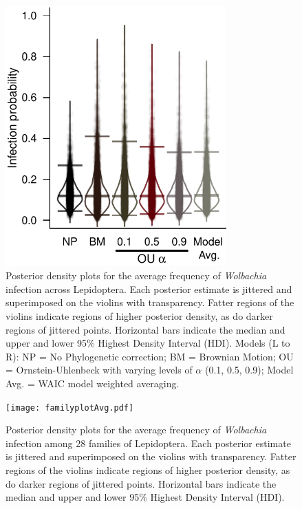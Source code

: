 \documentclass{frontiersSCNS} %
\begin{document}
\begin{figure}[h!]
  \begin{center}
    \includegraphics[width=85mm]{infection_Prob.pdf}
    \caption{Posterior density plots for the average frequency of \textit{Wolbachia} infection across Lepidoptera. Each posterior estimate is jittered and superimposed on the violins with transparency. Fatter regions of the  violins indicate regions of higher posterior density, as do darker regions of jittered points. Horizontal bars indicate the median and upper and lower 95\% Highest Density Interval (HDI).  Models (L to R): NP = No Phylogenetic correction; BM = Brownian Motion; OU = Ornstein-Uhlenbeck with varying levels of $\alpha$ (0.1, 0.5, 0.9); Model Avg. = WAIC model weighted averaging.}
 \label{grand}
  \end{center}
\end{figure}

\newpage 

\begin{figure}[h!]
  \begin{center}
    \texttt{[image: familyplotAvg.pdf]}
    \caption{Posterior density plots for the average frequency of \textit{Wolbachia} infection among 28 families of Lepidoptera. Each posterior estimate is jittered and superimposed on the violins with transparency. Fatter regions of the  violins indicate regions of higher posterior density, as do darker regions of jittered points. Horizontal bars indicate the median and upper and lower 95\% Highest Density Interval (HDI).}
 \label{familyplot}
  \end{center}
\end{figure}
\newpage
\end{document}
